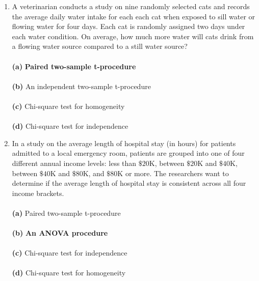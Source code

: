 \documentclass[12pt]{article}
\begin{document}
\begin{enumerate}[leftmargin=\labelsep]
\item A veterinarian conducts a study on nine randomly selected cats and records the average daily water intake for each each cat when exposed to sill water or flowing water for four days. Each cat is randomly assigned two days under each water condition. On average, how much more water will cats drink from a flowing water source compared to a still water source?\\ \vspace{1mm}\\
{\bf (a)} \hspace{2mm} {\bf Paired two-sample t-procedure}\\ \vspace{1mm}\\
{\bf (b)} \hspace{2mm} An independent two-sample t-procedure\\   \vspace{1mm}\\
{\bf (c)} \hspace{2mm} Chi-square test for homogeneity\\  \vspace{1mm}\\
{\bf (d)} \hspace{2mm} Chi-square test for independence\\

\item In a study on the average length of hospital stay (in hours) for patients admitted to a local emergency room, patients are grouped into one of four different annual income levels: less than $\$20$K, between $\$20$K and $\$40$K, between $\$40$K and $\$80$K, and $\$80$K or more. The researchers want to determine if the average length of hospital stay is consistent across all four income brackets.\\ \vspace{1mm}\\
{\bf (a)} \hspace{2mm} Paired two-sample t-procedure\\ \vspace{1mm}\\
{\bf (b)} \hspace{2mm} {\bf An ANOVA procedure}\\   \vspace{1mm}\\
{\bf (c)} \hspace{2mm} Chi-square test for independence\\  \vspace{1mm}\\
{\bf (d)} \hspace{2mm} Chi-square test for homogeneity\\


\end{enumerate}
\end{document}
